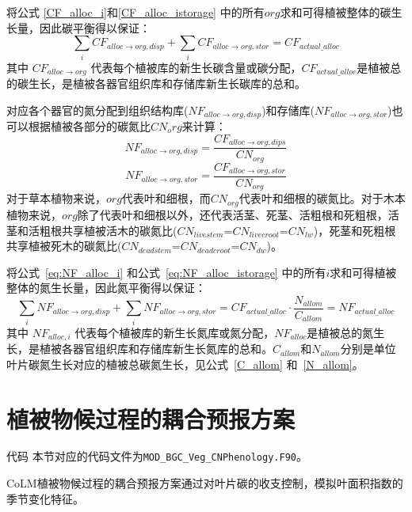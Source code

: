 将公式 \eqref{CF_alloc_i}和\eqref{CF_alloc_istorage} 中的所有$org$求和可得植被整体的碳生长量，因此碳平衡得以保证：
\begin{equation}
  \sum_{i}{CF_{alloc\rightarrow org,disp}}+\sum_{i}{CF_{alloc\rightarrow org,stor}}=CF_{actual\_alloc}
\end{equation}
其中 $CF_{alloc\rightarrow org}$ 代表每个植被库的新生长碳含量或碳分配，$CF_{actual\_alloc}$是植被总的碳生长，是植被各器官组织库和存储库新生长碳库的总和。


 对应各个器官的氮分配到组织结构库($NF_{alloc\rightarrow org,disp}$)和存储库($NF_{alloc\rightarrow org,stor}$)也可以根据植被各部分的碳氮比$CN_org$来计算：
\begin{equation}\label{eq:NF_alloc_i}
  NF_{alloc\rightarrow org,disp} = \frac{CF_{alloc\rightarrow org,dips}}{CN_{org}}
\end{equation}
\begin{equation}\label{eq:NF_alloc_istorage}
  NF_{alloc\rightarrow org,stor} = \frac{CF_{alloc\rightarrow org,stor}}{CN_{org}}
\end{equation}
对于草本植物来说，$org$代表叶和细根，而$CN_{org}$代表叶和细根的碳氮比。对于木本植物来说，$org$除了代表叶和细根以外，还代表活茎、死茎、活粗根和死粗根，活茎和活粗根共享植被活木的碳氮比($CN_{livestem}$=$CN_{livecroot}$=$CN_{lw}$)，死茎和死粗根共享植被死木的碳氮比($CN_{deadstem}$=$CN_{deadcroot}$=$CN_{dw}$)。


将公式~\eqref{eq:NF_alloc_i} 和公式~\eqref{eq:NF_alloc_istorage} 中的所有$i$求和可得植被整体的氮生长量，因此氮平衡得以保证：
\begin{equation}
  \sum_{i}{NF_{alloc\rightarrow org,disp}}+\sum_{i}{NF_{alloc\rightarrow org,stor}}=CF_{actual\_alloc}\cdot \frac{N_{allom}}{C_{allom}}=NF_{actual\_alloc}
\end{equation}
其中 $NF_{alloc,i}$ 代表每个植被库的新生长氮库或氮分配，$NF_{alloc}$是植被总的氮生长，是植被各器官组织库和存储库新生长氮库的总和。$C_{allom}$和$N_{allom}$分别是单位叶片碳氮生长对应的植被总碳氮生长，见公式~\eqref{C_allom} 和~\eqref{N_allom}。


\section{植被物候过程的耦合预报方案}\label{植被物候过程的耦合预报方案}
\begin{mymdframed}{代码}
本节对应的代码文件为\texttt{MOD\_BGC\_Veg\_CNPhenology.F90}。
\end{mymdframed}
CoLM植被物候过程的耦合预报方案通过对叶片碳的收支控制，模拟叶面积指数的季节变化特征。


